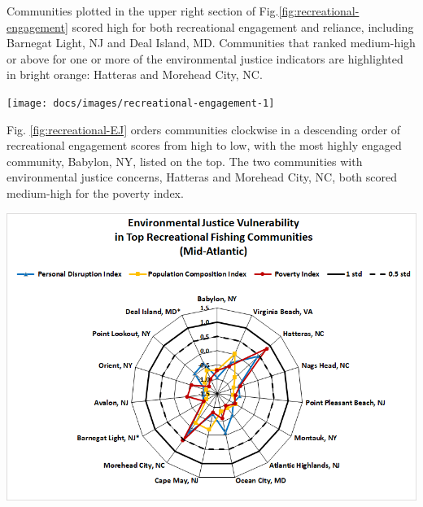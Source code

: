 \documentclass[
  10pt,
]{article}
\let\origfigure\figure
\let\endorigfigure\endfigure
\renewenvironment{figure}[1][2] {
    \expandafter\origfigure\expandafter[H]
} {
    \endorigfigure
}
\begin{document}
Communities plotted in the upper right section of
Fig.\ref{fig:recreational-engagement} scored high for both recreational
engagement and reliance, including Barnegat Light, NJ and Deal Island,
MD. Communities that ranked medium-high or above for one or more of the
environmental justice indicators are highlighted in bright orange:
Hatteras and Morehead City, NC.

\begin{figure}

{\centering \texttt{[image: docs/images/recreational-engagement-1]} 

}

\caption{Recreational engagement and reliance, and environmental justice vulnerability, for the top recreationally engaged and reliant fishing communities in the Mid-Atlantic. Communities ranked medium-high or above for one or more of the environmental justice indicators are highlighted in bright orange. Community scored high (1.00 and above) for both commercial engagement and reliance indicators.}\label{fig:recreational-engagement}
\end{figure}

Fig. \ref{fig:recreational-EJ} orders communities clockwise in a
descending order of recreational engagement scores from high to low,
with the most highly engaged community, Babylon, NY, listed on the top.
The two communities with environmental justice concerns, Hatteras and
Morehead City, NC, both scored medium-high for the poverty index.

\begin{figure}

{\centering \includegraphics[width=0.7\linewidth]{images/EJ_Recreational_MAB} 

}

\caption{Environmental justice indicators (Poverty Index, population composition index, and personal disruption index) for top recreational fishing communities in Mid-Atlantic. *Community scored high (1.00 and above) for both commercial engagement and reliance indicators.}\label{fig:recreational-EJ}
\end{figure}
\end{document}
